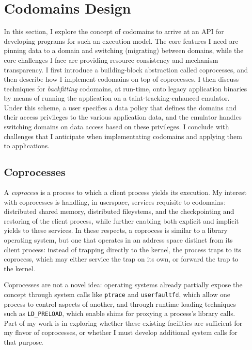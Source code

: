 \section{Codomains Design}
\label{sec:codomains-design}

In this section, I explore the concept of codomains to arrive at an
API for developing programs for such an execution model.
%
The core features I need are pinning data to a domain and switching
(migrating) between domains, while the core challenges I face are providing
resource consistency and mechanism transparency.
%
I first introduce a building-block abstraction called coprocesses, and then
describe how I implement codomains on top of coprocesses.
%
I then discuss techniques for \emph{backfitting} codomains, at run-time, onto legacy
application binaries by means of running the application on a
taint-tracking-enhanced emulator.
%
Under this scheme, a user specifies a data policy that defines the domains and
their access privileges to the various application data, and the emulator
handles switching domains on data access based on these privileges.
%
I conclude with challenges that I anticipate when implementating codomains and
applying them to applications.


\subsection{Coprocesses}

A \emph{coprocess} is a process to which a client process yields its
execution.
%
My interest with coprocesses is handling, in userspace, services requisite to
codomains: distributed shared memory, distributed fileystems, and the
checkpointing and restoring of the client process, while further enabling both
explicit and implicit yields to these services.
%
In these respects, a coprocess is similar to a library operating system, but
one that operates in an address space distinct from its client process: instead of
trapping directly to the kernel, the process traps to its coprocess, which may
either service the trap on its own, or forward the trap to the kernel.


Coprocesses are not a novel idea: operating systems already partially expose the
concept through system calls like \texttt{ptrace} and
\texttt{userfaultfd}, which allow one process to control aspects of another,
and through runtime loading techniques such as \texttt{LD\_PRELOAD}, which
enable shims for proxying a process's library calls.
%
Part of my work is in exploring whether these existing facilities are
sufficient for my flavor of coprocesses, or whether I must develop additional
system calls for that purpose.


